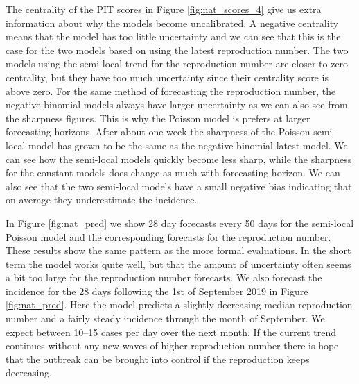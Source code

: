 \documentclass[12pt]{article}
\begin{document}
The centrality of the PIT scores in Figure \ref{fig:nat_scores_4} give us extra information about why the models become uncalibrated. A negative centrality means that the model has too little uncertainty and we can see that this is the case for the two models based on using the latest reproduction number. The two models using the semi-local trend for the reproduction number are closer to zero centrality, but they have too much uncertainty since their centrality score is above zero. For the same method of forecasting the reproduction number, the negative binomial models always have larger uncertainty as we can also see from the sharpness figures. This is why the Poisson model is prefers at larger forecasting horizons. After about one week the sharpness of the Poisson semi-local model has grown to be the same as the negative binomial latest model. We can see how the semi-local models quickly become less sharp, while the sharpness for the constant models does change as much with forecasting horizon.  We can also see that the two semi-local models have a small negative bias indicating that on average they underestimate the incidence.

In Figure \ref{fig:nat_pred} we show 28 day forecasts every 50 days for the semi-local Poisson model and the corresponding forecasts for the reproduction number. These results show the same pattern as the more formal evaluations. In the short term the model works quite well, but that the amount of uncertainty often seems a bit too large for the reproduction number forecasts. We also forecast the incidence for the 28 days following the 1st of September 2019 in Figure \ref{fig:nat_pred}. Here the model predicts a slightly decreasing median reproduction number and a fairly steady incidence through the month of September. We expect between 10--15 cases per day over the next month. If the current trend continues without any new waves of higher reproduction number there is hope that the outbreak can be brought into control if the reproduction keeps decreasing. 
\end{document}

